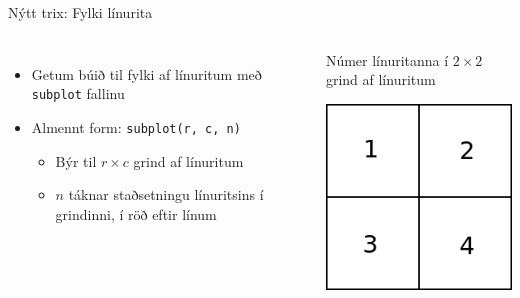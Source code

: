 \documentclass{beamer}
\begin{document}
\begin{frame}{Nýtt trix: Fylki línurita}
\begin{columns}
\begin{itemize}
 \item Getum búið til fylki af línuritum með \texttt{subplot} fallinu
 \item Almennt form: \texttt{subplot(r, c, n)}
 \begin{itemize}
  \item Býr til $r \times c$ grind af línuritum
  \item $n$ táknar staðsetningu línuritsins í grindinni, í röð eftir línum
 \end{itemize}
\end{itemize}
\begin{center}
Númer línuritanna í $2 \times 2$ grind af línuritum

\includegraphics[width=0.8\linewidth]{../Pics/subplotgrid}
\end{center}
\end{columns}
\end{frame}
\end{document}
